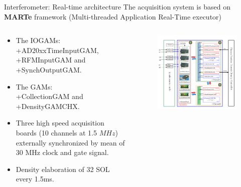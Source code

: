\documentclass{beamer}
\begin{document}
\begin{frame}{Interferometer: Real-time architecture}
\scriptsize
The acquisition system is based on \textbf{MARTe} framework (Multi-threaded Application Real-Time executor)

\begin{columns}
	\begin{column}{0.4\textwidth}
	    \begin{center}
	    
        \begin{itemize}
        	\item {\color{red} The IOGAMs:\\
        	+AD20xxTimeInputGAM, +RFMInputGAM and +SynchOutputGAM.}
        	\item  {\color{blue} The GAMs:\\
        	+CollectionGAM and +DensityGAMCHX.}
        	\item Three high speed acquisition boards (10 channels at 1.5 $MHz$) externally synchronized by mean of 30 MHz clock and gate signal.
        	\item Density elaboration of 32 SOL every 1.5ms.
        \end{itemize}    
	    
    	\end{center}
    	\end{column}
    	\begin{column}{0.6\textwidth}
            \begin{figure}
                \vspace*{-0.8cm}
            	\centering
            	\includegraphics[width=1\textwidth]{inter/interf_MARTe.png}
            \end{figure}
        \scriptsize	
    \end{column}
\end{columns} 


\end{frame}
\end{document}
